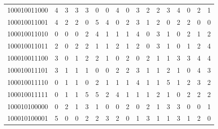 \documentclass[10pt,a4paper]{article}
\begin{document}
\begin{longtable}{ |c|c|c|c|c|c|c|c|c|c|c|c|c|c|c|c|c| }
    100010011000              & 4                            & 3                                & 3                            & 3                              & 0   & 0   & 4   & 0   & 3   & 2   & 2   & 3   & 4   & 0   & 2   & 1   \\
    100010011001              & 4                            & 2                                & 2                            & 0                              & 5   & 4   & 0   & 2   & 3   & 1   & 2   & 0   & 2   & 2   & 0   & 0   \\
    100010011010              & 0                            & 0                                & 0                            & 2                              & 4   & 1   & 1   & 1   & 4   & 0   & 3   & 1   & 0   & 2   & 1   & 2   \\
    100010011011              & 2                            & 0                                & 2                            & 2                              & 1   & 1   & 2   & 1   & 2   & 0   & 3   & 1   & 0   & 1   & 2   & 4   \\
    100010011100              & 3                            & 0                                & 1                            & 2                              & 2   & 1   & 0   & 2   & 0   & 2   & 1   & 1   & 3   & 3   & 4   & 4   \\
    100010011101              & 3                            & 1                                & 1                            & 1                              & 0   & 0   & 2   & 2   & 3   & 1   & 1   & 2   & 1   & 0   & 4   & 3   \\
    100010011110              & 0                            & 1                                & 1                            & 0                              & 2   & 1   & 1   & 1   & 4   & 1   & 1   & 5   & 1   & 2   & 3   & 2   \\
    100010011111              & 0                            & 1                                & 1                            & 5                              & 5   & 2   & 4   & 1   & 1   & 1   & 2   & 1   & 0   & 2   & 2   & 2   \\
    100010100000              & 0                            & 2                                & 1                            & 3                              & 1   & 0   & 0   & 2   & 0   & 2   & 1   & 3   & 3   & 0   & 0   & 1   \\
    100010100001              & 5                            & 0                                & 0                            & 2                              & 2   & 3   & 2   & 0   & 1   & 3   & 1   & 1   & 3   & 1   & 2   & 0   \\

\end{longtable}
\end{document}
